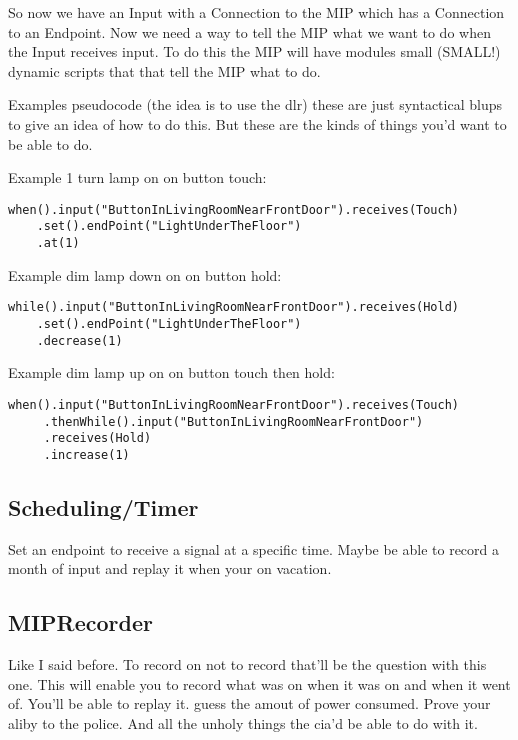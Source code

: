 \documentclass[a4paper]{article}
\begin{document}
So now we have an Input with a Connection to the MIP which has a Connection to an Endpoint. Now we need a way to tell the MIP what we want to do when the Input receives input. To do this the MIP will have modules small (SMALL!) dynamic scripts that that tell the MIP what to do. 

Examples pseudocode (the idea is to use the dlr) these are just syntactical blups to give an idea of how to do this. But these are the kinds of things you'd want to be able to do.

Example 1 turn lamp on on button touch:
\begin{verbatim}
when().input("ButtonInLivingRoomNearFrontDoor").receives(Touch)
    .set().endPoint("LightUnderTheFloor")
    .at(1)
\end{verbatim}

Example dim lamp down on on button hold:
\begin{verbatim}
while().input("ButtonInLivingRoomNearFrontDoor").receives(Hold)
    .set().endPoint("LightUnderTheFloor")
    .decrease(1)
\end{verbatim}

Example dim lamp up on on button touch then hold:
\begin{verbatim}
when().input("ButtonInLivingRoomNearFrontDoor").receives(Touch)
     .thenWhile().input("ButtonInLivingRoomNearFrontDoor")
     .receives(Hold)
     .increase(1)
\end{verbatim}
 
\subsection{Scheduling/Timer}
Set an endpoint to receive a signal at a specific time. Maybe be able to record a month of input and replay it when your on vacation.

\subsection{MIPRecorder}
Like I said before. To record on not to record that'll be the question with this one. This will enable you to record what was on when it was on and when it went of. You'll be able to replay it. guess the amout of power consumed. Prove your aliby to the police. And all the unholy things the cia'd be able to do with it.
\end{document}

